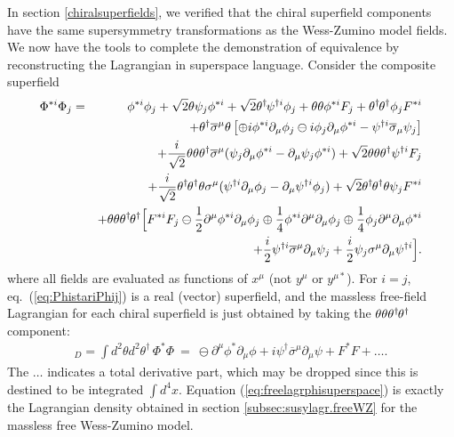 \documentclass[11pt]{article}
\def\BDpos{}
\def\BDneg{-}
\def\BDplus{+}
\def\BDminus{-}
\def\thetasigmamuthetadagger{\theta\sigma^\mu\theta^\dagger}
\def\BDpos{-}
\def\BDneg{}
\def\BDplus{-}
\def\BDminus{+}
\def\thetasigmamuthetadagger{\theta^\dagger\sigmabar^\mu\theta}
\def\BDpos{\oplus}
\def\BDneg{\ominus}
\def\BDplus{\oplus}
\def\BDminus{\ominus}
\def\thetasigmamuthetadagger{\theta\sigma^\mu\theta^\dagger}
\def\BDpos{\ominus}
\def\BDneg{\oplus}
\def\BDplus{\ominus}
\def\BDminus{\oplus}
\def\thetasigmamuthetadagger{\theta^\dagger\sigmabar^\mu\theta}
\newcommand{\thdthd}{\theta^\dagger\hspace{-1pt}\theta^\dagger}
\def\beq{\begin{eqnarray}}
\def\eeq{\end{eqnarray}}
\def\sigmabar{\overline\sigma}
\begin{document}
In section \ref{chiralsuperfields}, we verified that the chiral 
superfield components have the same supersymmetry transformations as the 
Wess-Zumino model fields. We now have the tools to complete the 
demonstration of equivalence by reconstructing the Lagrangian in 
superspace language. Consider the composite superfield
\beq
\Phi^{*i} \Phi_j 
&=& 
\phi^{*i} \phi_j 
+ \sqrt{2} \theta \psi_j \phi^{*i}
+ \sqrt{2} \theta^\dagger\hspace{-1pt} \psi^{\dagger i} \phi_j
+ \theta\theta \phi^{*i} F_j
+ \thdthd \phi_j F^{*i}
\nonumber \\ &&
+ \thetasigmamuthetadagger  \left [
\BDneg i \phi^{*i} \partial_\mu \phi_j 
\BDplus i \phi_j \partial_\mu \phi^{*i}
- \psi^{\dagger i} \sigmabar_\mu \psi_j
\right ]
\nonumber \\ &&
+ \frac{i}{\sqrt{2}} \theta\theta\theta^\dagger \sigmabar^\mu (
\psi_j \partial_\mu \phi^{*i} - \partial_\mu \psi_j \phi^{*i}) 
+ \sqrt{2} \theta\theta \theta^\dagger \psi^{\dagger i} F_j
\nonumber \\ &&
+ \frac{i}{\sqrt{2}} \thdthd\theta \sigma^\mu (
\psi^{\dagger i} \partial_\mu \phi_j 
- \partial_\mu \psi^{\dagger i} \phi_j) 
+ \sqrt{2} \thdthd \theta \psi_j F^{*i}
\nonumber \\ &&
+ \theta\theta\thdthd 
\Bigl [
F^{*i} F_j 
\BDplus \frac{1}{2}\partial^\mu \phi^{*i} \partial_\mu \phi_j  
\BDminus \frac{1}{4}\phi^{*i} \partial^\mu \partial_\mu \phi_j
\BDminus \frac{1}{4}\phi_j \partial^\mu \partial_\mu \phi^{*i}
\nonumber \\ && \quad
+ \frac{i}{2} \psi^{\dagger i} \sigmabar^\mu \partial_\mu \psi_j  
+ \frac{i}{2} \psi_j \sigma^\mu \partial_\mu \psi^{\dagger i} 
\Bigr ] .
\label{eq:PhistariPhij}
\eeq
where 
all fields 
are evaluated as functions of $x^\mu$ (not $y^\mu$ or $y^{\mu *}$). 
For $i=j$, eq.~(\ref{eq:PhistariPhij}) is a real (vector) superfield, and
the massless free-field 
Lagrangian for each chiral superfield is just obtained by taking the $\theta\theta\thdthd$ component:
\beq
[\Phi^* \Phi]_D = \int d^2\theta d^2\theta^\dagger \,\Phi^* \Phi
\>=\> \BDpos \partial^\mu \phi^* \partial_\mu \phi 
+ i \psi^\dagger \sigmabar^\mu \partial_\mu \psi
+ F^* F + \ldots .
\label{eq:freelagrphisuperspace}
\eeq 
The $\ldots$ indicates a total derivative part, which may be 
dropped since this is destined to be integrated $\int d^4 x$. Equation 
(\ref{eq:freelagrphisuperspace}) is exactly the Lagrangian density 
obtained in section \ref{subsec:susylagr.freeWZ} for the massless free 
Wess-Zumino model.
\end{document}
